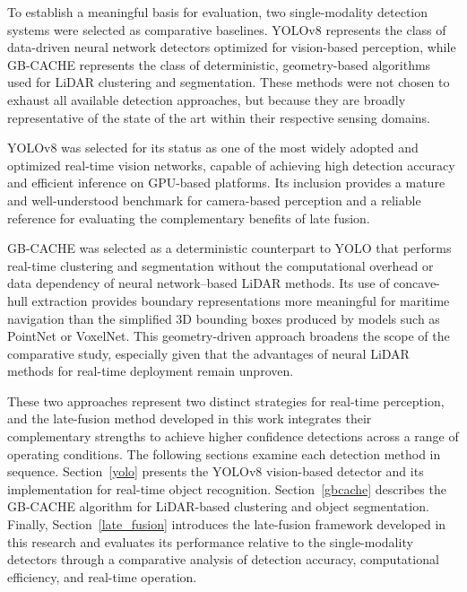 \documentclass{erauthesis}
\begin{document}
To establish a meaningful basis for evaluation, two single-modality detection systems were selected as comparative baselines.
YOLOv8 represents the class of data-driven neural network detectors optimized for vision-based perception, while GB-CACHE represents the class of deterministic, geometry-based algorithms used for LiDAR clustering and segmentation.
These methods were not chosen to exhaust all available detection approaches, but because they are broadly representative of the state of the art within their respective sensing domains.

YOLOv8 was selected for its status as one of the most widely adopted and optimized real-time vision networks, capable of achieving high detection accuracy and efficient inference on GPU-based platforms.
Its inclusion provides a mature and well-understood benchmark for camera-based perception and a reliable reference for evaluating the complementary benefits of late fusion.

GB-CACHE was selected as a deterministic counterpart to YOLO that performs real-time clustering and segmentation without the computational overhead or data dependency of neural network–based LiDAR methods.
Its use of concave-hull extraction provides boundary representations more meaningful for maritime navigation than the simplified 3D bounding boxes produced by models such as PointNet or VoxelNet.
This geometry-driven approach broadens the scope of the comparative study, especially given that the advantages of neural LiDAR methods for real-time deployment remain unproven.

These two approaches represent two distinct strategies for real-time perception, and the late-fusion method developed in this work integrates their complementary strengths to achieve higher confidence detections across a range of operating conditions.
The following sections examine each detection method in sequence.
Section~\ref{yolo} presents the YOLOv8 vision-based detector and its implementation for real-time object recognition.
Section~\ref{gbcache} describes the GB-CACHE algorithm for LiDAR-based clustering and object segmentation.
Finally, Section~\ref{late_fusion} introduces the late-fusion framework developed in this research and evaluates its performance relative to the single-modality detectors through a comparative analysis of detection accuracy, computational efficiency, and real-time operation.

\end{document}

